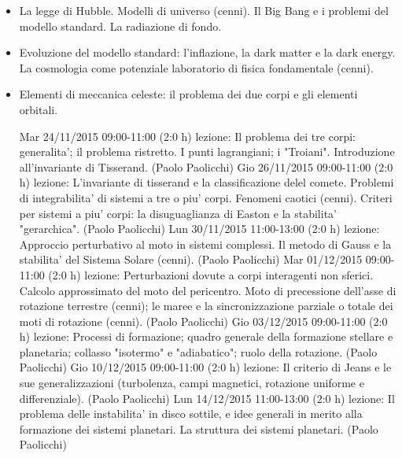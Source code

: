 \begin{itemize}
\item La legge di Hubble. Modelli di universo (cenni). Il Big Bang e i problemi del modello standard. La radiazione di fondo. 

\item Evoluzione del modello standard: l'inflazione, la dark matter e la dark energy. La cosmologia come potenziale laboratorio di fisica fondamentale (cenni). 

\item Elementi di meccanica celeste: il problema dei due corpi e gli elementi orbitali.

Mar 24/11/2015 09:00-11:00 (2:0 h) lezione: Il problema dei tre corpi: generalita'; il problema ristretto. I punti lagrangiani; i "Troiani". Introduzione all'invariante di Tisserand. (Paolo Paolicchi)
Gio 26/11/2015 09:00-11:00 (2:0 h) lezione: L'invariante di tisserand e la classificazione delel comete. Problemi di integrabilita' di sistemi a tre o piu' corpi. Fenomeni caotici (cenni). Criteri per sistemi a piu' corpi: la disuguaglianza di Easton e la stabilita' "gerarchica". (Paolo Paolicchi)
Lun 30/11/2015 11:00-13:00 (2:0 h) lezione: Approccio perturbativo al moto in sistemi complessi. Il metodo di Gauss e la stabilita' del Sistema Solare (cenni). (Paolo Paolicchi)
Mar 01/12/2015 09:00-11:00 (2:0 h) lezione: Perturbazioni dovute a corpi interagenti non sferici. Calcolo approssimato del moto del pericentro. Moto di precessione dell'asse di rotazione terrestre (cenni); le maree e la sincronizzazione parziale o totale dei moti di rotazione (cenni). (Paolo Paolicchi)
Gio 03/12/2015 09:00-11:00 (2:0 h) lezione: Processi di formazione; quadro generale della formazione stellare e planetaria; collasso "isotermo" e "adiabatico"; ruolo della rotazione. (Paolo Paolicchi)
Gio 10/12/2015 09:00-11:00 (2:0 h) lezione: Il criterio di Jeans e le sue generalizzazioni (turbolenza, campi magnetici, rotazione uniforme e differenziale). (Paolo Paolicchi)
Lun 14/12/2015 11:00-13:00 (2:0 h) lezione: Il problema delle instabilita' in disco sottile, e idee generali in merito alla formazione dei sistemi planetari. La struttura dei sistemi planetari. (Paolo Paolicchi)

\end{itemize}

\clearpage